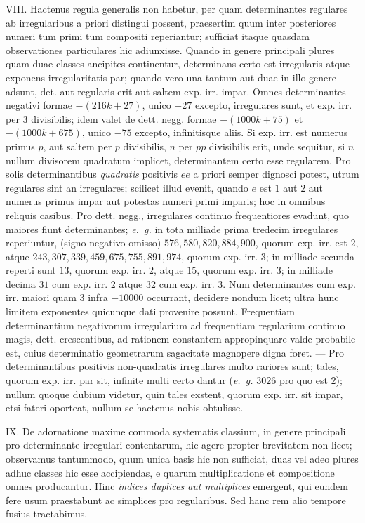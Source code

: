 VIII. Hactenus regula generalis non habetur, per quam determinantes regulares ab irregularibus a priori distingui possent, praesertim quum inter posteriores numeri tum primi tum compositi reperiantur; sufficiat itaque quasdam observationes particulares hic adiunxisse. Quando in genere principali plures quam duae classes ancipites continentur, determinans certo est irregularis atque exponens irregularitatis par; quando vero una tantum aut duae in illo genere adsunt, det. aut regularis erit aut saltem exp. irr. impar. Omnes determinantes negativi formae \(-(216k+27)\), unico \(-27\) excepto, irregulares sunt, et exp. irr. per \(3\) divisibilis; idem valet de dett. negg. formae \(-(1000k+75)\) et \(-(1000k+675)\), unico \(-75\) excepto, infinitisque aliis. Si exp. irr. est numerus primus \(p\), aut saltem per \(p\) divisibilis, \(n\) per \(pp\) divisibilis erit, unde sequitur, si \(n\) nullum divisorem quadratum implicet, determinantem certo esse regularem. Pro solis determinantibus \textit{quadratis} positivis \(ee\) a priori semper dignosci potest, utrum regulares sint an irregulares; scilicet illud evenit, quando \(e\) est \(1\) aut \(2\) aut numerus primus impar aut potestas numeri primi imparis; hoc in omnibus reliquis casibus. Pro dett. negg., irregulares continuo frequentiores evadunt, quo maiores fiunt determinantes; \textit{e.~g.} in tota milliade prima tredecim irregulares reperiuntur, (signo negativo omisso) \(576,580,820,884,900\), quorum exp. irr. est \(2\), atque \(243,307,339,459,675,755,891,974\), quorum exp. irr. \(3\); in milliade secunda reperti sunt \(13\), quorum exp. irr. \(2\), atque \(15\), quorum exp. irr. \(3\); in milliade decima \(31\) cum exp. irr. \(2\) atque \(32\) cum exp. irr. \(3\). Num determinantes cum exp. irr. maiori quam \(3\) infra \(-10000\) occurrant, decidere nondum licet; ultra hunc limitem exponentes quicunque dati provenire possunt. Frequentiam determinantium negativorum irregularium ad frequentiam regularium continuo magis, dett. crescentibus, ad rationem constantem appropinquare valde probabile est, cuius determinatio geometrarum sagacitate magnopere digna foret. — Pro determinantibus positivis non-quadratis irregulares multo rariores sunt; tales, quorum exp. irr. par sit, infinite multi certo dantur (\textit{e.~g.} \(3026\) pro quo est \(2\)); nullum quoque dubium videtur, quin tales exstent, quorum exp. irr. sit impar, etsi fateri oporteat, nullum se hactenus nobis obtulisse.

IX. De adornatione maxime commoda systematis classium, in genere principali pro determinante irregulari contentarum, hic agere propter brevitatem non licet; observamus tantummodo, quum unica basis hic non sufficiat, duas
vel adeo plures adhuc classes hic esse accipiendas, e quarum multiplicatione et compositione omnes producantur. Hinc \textit{indices duplices aut multiplices} emergent, qui eundem fere usum praestabunt ac simplices pro regularibus. Sed hanc rem alio tempore fusius tractabimus.

